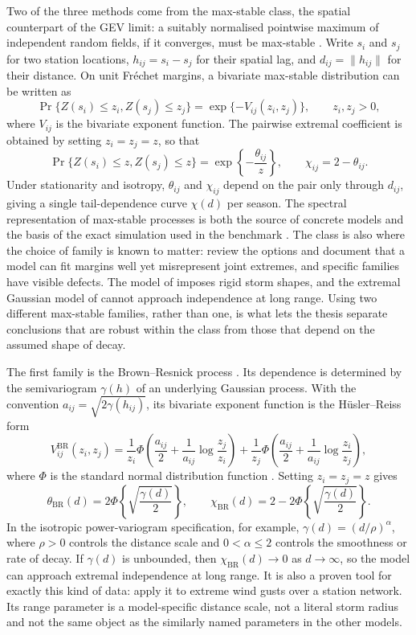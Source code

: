 Two of the three methods come from the max-stable class, the spatial counterpart of the GEV limit: a suitably normalised pointwise maximum of independent random fields, if it converges, must be max-stable \citep{dehaan1984,dehaan2006}. Write \(s_i\) and \(s_j\) for two station locations, \(h_{ij}=s_i-s_j\) for their spatial lag, and \(d_{ij}=\|h_{ij}\|\) for their distance. On unit Fr\'echet margins, a bivariate max-stable distribution can be written as
\[
    \Pr\{Z(s_i)\leq z_i, Z(s_j)\leq z_j\}
    =
    \exp\{-V_{ij}(z_i,z_j)\},
    \qquad z_i,z_j>0,
\]
where \(V_{ij}\) is the bivariate exponent function. The pairwise extremal coefficient is obtained by setting \(z_i=z_j=z\), so that
\[
    \Pr\{Z(s_i)\leq z, Z(s_j)\leq z\}
    =
    \exp\left\{-\frac{\theta_{ij}}{z}\right\},
    \qquad
    \chi_{ij}=2-\theta_{ij}.
\]
Under stationarity and isotropy, \(\theta_{ij}\) and \(\chi_{ij}\) depend on the pair only through \(d_{ij}\), giving a single tail-dependence curve \(\chi(d)\) per season. The spectral representation of max-stable processes is both the source of concrete models and the basis of the exact simulation used in the benchmark \citep{dombry2016}. The class is also where the choice of family is known to matter: \citet{davison2012} review the options and document that a model can fit margins well yet misrepresent joint extremes, and specific families have visible defects. The model of \citet{smith1990} imposes rigid storm shapes, and the extremal Gaussian model of \citet{schlather2002} cannot approach independence at long range. Using two different max-stable families, rather than one, is what lets the thesis separate conclusions that are robust within the class from those that depend on the assumed shape of decay.

The first family is the Brown--Resnick process \citep{brown1977,kabluchko2009}. Its dependence is determined by the semivariogram \(\gamma(h)\) of an underlying Gaussian process. With the convention \(a_{ij}=\sqrt{2\gamma(h_{ij})}\), its bivariate exponent function is the H\"usler--Reiss form
\[
    V_{ij}^{\mathrm{BR}}(z_i,z_j)
    =
    \frac{1}{z_i}
    \Phi\left(
    \frac{a_{ij}}{2}
    +
    \frac{1}{a_{ij}}\log\frac{z_j}{z_i}
    \right)
    +
    \frac{1}{z_j}
    \Phi\left(
    \frac{a_{ij}}{2}
    +
    \frac{1}{a_{ij}}\log\frac{z_i}{z_j}
    \right),
\]
where \(\Phi\) is the standard normal distribution function \citep{husler1989}. Setting \(z_i=z_j=z\) gives
\[
    \theta_{\mathrm{BR}}(d)
    =
    2\Phi\left\{
    \sqrt{\frac{\gamma(d)}{2}}
    \right\},
    \qquad
    \chi_{\mathrm{BR}}(d)
    =
    2
    -
    2\Phi\left\{
    \sqrt{\frac{\gamma(d)}{2}}
    \right\}.
\]
In the isotropic power-variogram specification, for example, \(\gamma(d)=(d/\rho)^{\alpha}\), where \(\rho>0\) controls the distance scale and \(0<\alpha\leq2\) controls the smoothness or rate of decay. If \(\gamma(d)\) is unbounded, then \(\chi_{\mathrm{BR}}(d)\to0\) as \(d\to\infty\), so the model can approach extremal independence at long range. It is also a proven tool for exactly this kind of data: \citet{oesting2017} apply it to extreme wind gusts over a station network. Its range parameter is a model-specific distance scale, not a literal storm radius and not the same object as the similarly named parameters in the other models.

